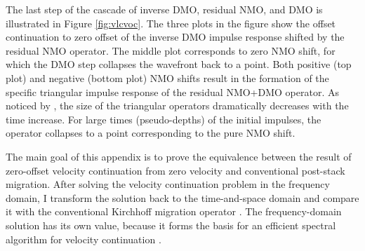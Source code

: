 The last step of the cascade of inverse DMO, residual NMO, and DMO is
illustrated in Figure \ref{fig:vlcvoc}. The three plots in the figure show
the offset continuation to zero offset of the inverse DMO impulse
response shifted by the residual NMO operator. The middle plot
corresponds to zero NMO shift, for which the DMO step collapses the
wavefront back to a point.  Both positive (top plot) and negative
(bottom plot) NMO shifts result in the formation of the specific
triangular impulse response of the residual NMO+DMO operator. As
noticed by \cite{Etgen.sepphd.68}, the size of the triangular
operators dramatically decreases with the time increase.  For large
times (pseudo-depths) of the initial impulses, the operator collapses
to a point corresponding to the pure NMO shift.



The main goal of this appendix is to prove the equivalence between the
result of zero-offset velocity continuation from zero velocity and
conventional post-stack migration. After solving the velocity
continuation problem in the frequency domain, I transform the solution
back to the time-and-space domain and compare it with the conventional
Kirchhoff migration operator \cite[]{GEO43-01-00490076}. The frequency-domain
solution has its own value, because it forms the basis for an efficient
spectral algorithm for velocity continuation \cite[]{second}. 
 
